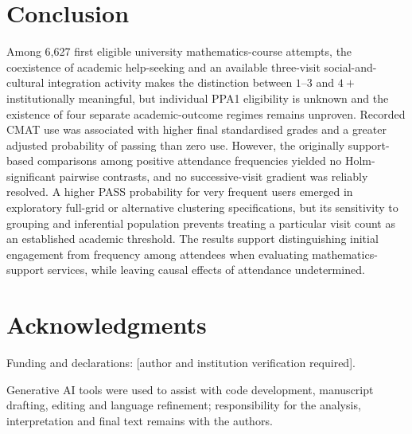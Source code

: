 \section{Conclusion}

Among 6,627 first eligible university mathematics-course attempts, the coexistence of academic help-seeking and an available three-visit social-and-cultural integration activity makes the distinction between $1$--$3$ and $4+$ institutionally meaningful, but individual PPA1 eligibility is unknown and the existence of four separate academic-outcome regimes remains unproven. Recorded CMAT use was associated with higher final standardised grades and a greater adjusted probability of passing than zero use. However, the originally support-based comparisons among positive attendance frequencies yielded no Holm-significant pairwise contrasts, and no successive-visit gradient was reliably resolved. A higher PASS probability for very frequent users emerged in exploratory full-grid or alternative clustering specifications, but its sensitivity to grouping and inferential population prevents treating a particular visit count as an established academic threshold. The results support distinguishing initial engagement from frequency among attendees when evaluating mathematics-support services, while leaving causal effects of attendance undetermined.

\section*{Acknowledgments}

Funding and declarations: [author and institution verification required].

Generative AI tools were used to assist with code development, manuscript drafting, editing and language refinement; responsibility for the analysis, interpretation and final text remains with the authors.







